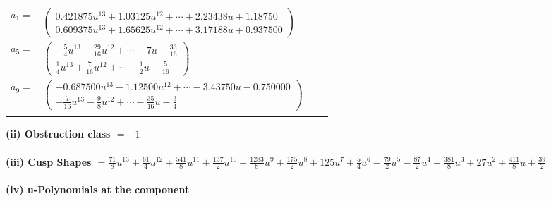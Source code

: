 \documentclass[1p]{elsarticle_modified}
\theoremstyle{definition}
\begin{document}
\begin{tabular}{m{7pt} m{180pt} m{7pt} m{180pt} }
\flushright $a_{1}=$&$\begin{pmatrix}0.421875 u^{13}+1.03125 u^{12}+\cdots+2.23438 u+1.18750\\0.609375 u^{13}+1.65625 u^{12}+\cdots+3.17188 u+0.937500\end{pmatrix}$ \\
\flushright $a_{5}=$&$\begin{pmatrix}-\frac{5}{4} u^{13}-\frac{29}{16} u^{12}+\cdots-7 u-\frac{33}{16}\\\frac{1}{4} u^{13}+\frac{7}{16} u^{12}+\cdots-\frac{1}{2} u-\frac{5}{16}\end{pmatrix}$ \\
\flushright $a_{9}=$&$\begin{pmatrix}-0.687500 u^{13}-1.12500 u^{12}+\cdots-3.43750 u-0.750000\\-\frac{7}{16} u^{13}-\frac{9}{8} u^{12}+\cdots-\frac{35}{16} u-\frac{3}{4}\end{pmatrix}$\\&\end{tabular}
\flushleft \textbf{(ii) Obstruction class $= -1$}\\~\\
\flushleft \textbf{(iii) Cusp Shapes $= \frac{71}{8} u^{13}+\frac{61}{4} u^{12}+\frac{541}{8} u^{11}+\frac{137}{2} u^{10}+\frac{1283}{8} u^9+\frac{175}{2} u^8+125 u^7+\frac{5}{4} u^6-\frac{79}{2} u^5-\frac{87}{2} u^4-\frac{381}{8} u^3+27 u^2+\frac{411}{8} u+\frac{39}{2}$}\\~\\
\newpage\renewcommand{\arraystretch}{1}
\flushleft \textbf{(iv) u-Polynomials at the component}\newline \\
\end{document}
